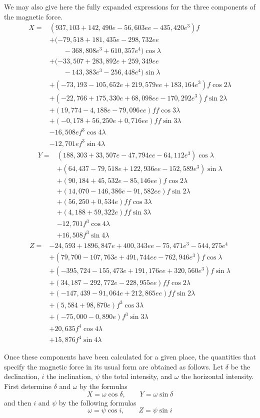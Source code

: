 We may also give here the fully expanded expressions for the three components of the magnetic force.
\[
\begin{aligned}
X={}&(937{,}103+142{,}490e-56{,}603ee-435{,}420e^3)f\\
&+(-79{,}518+181{,}435e-298{,}732ee\\
&\qquad-368{,}808e^3+610{,}357e^4)\cos\lambda\\
&+(-33{,}507+283{,}892e+259{,}349ee\\
&\qquad-143{,}383e^3-256{,}448e^4)\sin\lambda\\
&+(-73{,}193-105{,}652e+219{,}579ee+183{,}164e^3)f\cos2\lambda\\
&+(-22{,}766+175{,}330e+68{,}098ee-170{,}292e^3)f\sin2\lambda\\
&+(19{,}774-4{,}188e-79{,}096ee)ff\cos3\lambda\\
&+(-0{,}178+56{,}250e+0{,}716ee)ff\sin3\lambda\\
&-16{,}508ef^3\cos4\lambda\\
&-12{,}701ef^3\sin4\lambda
\end{aligned}
\]
\[
\begin{aligned}
Y={}&(188{,}303+33{,}507e-47{,}794ee-64{,}112e^3)\cos\lambda\\
&+(64{,}437-79{,}518e+122{,}936ee-152{,}589e^3)\sin\lambda\\
&+(90{,}184+45{,}532e-85{,}146ee)f\cos2\lambda\\
&+(14{,}070-146{,}386e-91{,}582ee)f\sin2\lambda\\
&+(56{,}250+0{,}534e)ff\cos3\lambda\\
&+(4{,}188+59{,}322e)ff\sin3\lambda\\
&-12{,}701f^3\cos4\lambda\\
&+16{,}508f^3\sin4\lambda
\end{aligned}
\]
\[
\begin{aligned}
Z={}&-24{,}593+1896{,}847e+400{,}343ee-75{,}471e^3-544{,}275e^4\\
&+(79{,}700-107{,}763e+491{,}744ee-762{,}946e^3)f\cos\lambda\\
&+(-395{,}724-155{,}473e+191{,}176ee+320{,}560e^3)f\sin\lambda\\
&+(34{,}187-292{,}772e-228{,}955ee)ff\cos2\lambda\\
&+(-147{,}439-91{,}064e+212{,}865ee)ff\sin2\lambda\\
&+(5{,}584+98{,}870e)f^3\cos3\lambda\\
&+(-75{,}000-0{,}890e)f^3\sin3\lambda\\
&+20{,}635f^4\cos4\lambda\\
&+15{,}876f^4\sin4\lambda
\end{aligned}
\]

Once these components have been calculated for a given place, the quantities that specify the magnetic force in its usual form are obtained as follows. Let $\delta$ be the declination, $i$ the inclination, $\psi$ the total intensity, and $\omega$ the horizontal intensity. First determine $\delta$ and $\omega$ by the formulas
\[
X=\omega\cos\delta,\qquad Y=\omega\sin\delta
\]
and then $i$ and $\psi$ by the following formulas
\[
\omega=\psi\cos i,\qquad Z=\psi\sin i
\]


